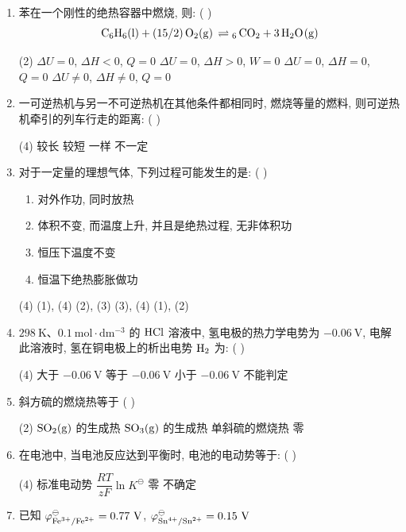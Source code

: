 \begin{enumerate}[label=\arabic*., itemsep=1.5ex]
    \begin{tasks}(2)
        \task $\Delta_\mathrm{r}H$
        \task $T\Delta_\mathrm{r}S$
        \task 一定为零
        \task 与 $\Delta_\mathrm{r}H$ 及 $T\Delta_\mathrm{r}S$ 均无关
    \end{tasks}
    \item 苯在一个刚性的绝热容器中燃烧, 则: ( )
    \[
    \ce{C_{6}H_{6}(l) + (15/2)O_{2}(g) \rightleftharpoons 6 CO_{2} + 3H_{2}O(g)}
    \]
    \begin{tasks}(2)
        \task $\Delta U = 0$, $\Delta H < 0$, $Q = 0$
        \task $\Delta U = 0$, $\Delta H > 0$, $W = 0$
        \task $\Delta U = 0$, $\Delta H = 0$, $Q = 0$
        \task $\Delta U \neq 0$, $\Delta H \neq 0$, $Q = 0$
    \end{tasks}
    \item 一可逆热机与另一不可逆热机在其他条件都相同时, 燃烧等量的燃料, 则可逆热机牵引的列车行走的距离: ( )
    \begin{tasks}(4)
        \task 较长
        \task 较短
        \task 一样
        \task 不一定
    \end{tasks}
    \item 对于一定量的理想气体, 下列过程可能发生的是: ( )
    \begin{enumerate}[label=(\arabic*), noitemsep, topsep=0pt, partopsep=0pt]
        \item 对外作功, 同时放热
        \item 体积不变, 而温度上升, 并且是绝热过程, 无非体积功
        \item 恒压下温度不变
        \item 恒温下绝热膨胀做功
    \end{enumerate}
    \begin{tasks}(4)
        \task (1), (4)
        \task (2), (3)
        \task (3), (4)
        \task (1), (2)
    \end{tasks}
    \item $298\ \mathrm{K}$、$0.1\ \mathrm{mol\cdot dm^{-3}}$ 的 $\ce{HCl}$ 溶液中, 氢电极的热力学电势为 $-0.06\ \mathrm{V}$, 电解此溶液时, 氢在铜电极上的析出电势 $\ce{H_{2}}$ 为: ( )
    \begin{tasks}(4)
        \task 大于 $-0.06\ \mathrm{V}$
        \task 等于 $-0.06\ \mathrm{V}$
        \task 小于 $-0.06\ \mathrm{V}$
        \task 不能判定
    \end{tasks}
    \item 斜方硫的燃烧热等于 ( )
    \begin{tasks}(2)
        \task $\ce{SO_{2}(g)}$ 的生成热
        \task $\ce{SO_{3}(g)}$ 的生成热
        \task 单斜硫的燃烧热
        \task 零
    \end{tasks}
    \item 在电池中, 当电池反应达到平衡时, 电池的电动势等于: ( )
    \begin{tasks}(4)
        \task 标准电动势
        \task $\dfrac{RT}{zF}\ln K^\ominus$
        \task 零
        \task 不确定
    \end{tasks}
    \item 已知 $\varphi^\ominus_{\ce{Fe^{3+}/Fe^{2+}}} = 0.77\ \mathrm{V}$, $\varphi^\ominus_{\ce{Sn^{4+}/Sn^{2+}}} = 0.15\ \mathrm{V}$ 
    

\end{enumerate}
